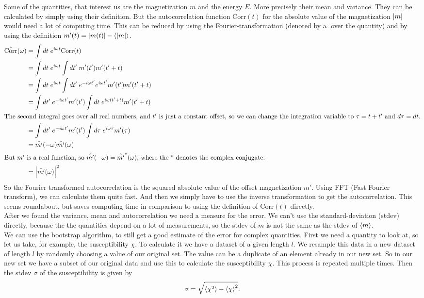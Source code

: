 Some of the quantities, that interest us are the magnetization $m$ and the energy $E$. More precisely their mean and variance. They can be calculated by simply using their definition. But the autocorrelation function Corr$(t)$ for the absolute value of the magnetization $\left\vert m \right\vert$ would need a lot of computing time. This can be reduced by using the Fourier-transformation (denoted by a \@ $\hat{}$ \@ over the quantity) and by using the definition $m'(t) = \left\vert m(t) \right\vert - \left\langle\left\vert m \right\vert\right\rangle$.
\begin{align}
  \hat{\text{Corr}}(\omega) & = \int dt\; e^{i \omega t} \text{Corr}(t) \\
  & = \int dt \; e^{i \omega t} \int dt'\; m'(t') m'(t'+t) \\
  & = \int dt\; e^{i \omega t} \int dt'\; e^{-i \omega t'} e^{i \omega t'} m'(t') m'(t'+t) \\
  & = \int dt'\; e^{-i \omega t'} m'(t') \int dt\; e^{i \omega (t' + t)} m'(t'+t) \\
  \intertext{The second integral goes over all real numbers, and $t'$ is just a constant offset, so we can change the integration variable to $\tau = t + t'$ and $d \tau = dt$.}
  & = \int dt'\; e^{-i \omega t'} m'(t') \int d\tau \; e^{i \omega \tau} m'(\tau) \\
  & = \hat{m'}(- \omega) \hat{m'}(\omega) \\
  \intertext{But $m'$ is a real function, so $\hat{m'}(- \omega) = \hat{m'}^*( \omega)$, where the $^*$ denotes the complex conjugate.}
  & = \left\vert\hat{m'}(\omega) \right\vert^2
\end{align}
So the Fourier transformed autocorrelation is the squared absolute value of the offset magnetization $m'$. Using FFT (Fast Fourier transform), we can calculate them quite fast. And then we simply have to use the inverse transformation to get the autocorrelation. This seems roundabout, but saves computing time in comparison to using the definition of Corr$(t)$ directly.\\

After we found the variance, mean and autocorrelation we need a measure for the error. We can't use the standard-deviation (stdev) directly, because the the quantities depend on a lot of measurements, so the stdev of $m$ is not the same as the stdev of $\left\langle m\right\rangle$.\\
We can use the bootstrap algorithm, to still get a good estimate of the error for complex quantities. First we need a quantity to look at, so let us take, for example, the susceptibility $\chi$. To calculate it we have a dataset of a given length $l$. We resample this data in a new dataset of length $l$ by randomly choosing a value of our original set. The value can be a duplicate of an element already in our new set. So in our new set we have a subset of our original data and use this to calculate the susceptibility $\chi$. This process is repeated multiple times. Then the stdev $\sigma$ of the susceptibility is given by
\begin{equation}
  \sigma = \sqrt{\left\langle\chi^2\right\rangle - \left\langle\chi\right\rangle^2}.
\end{equation}
